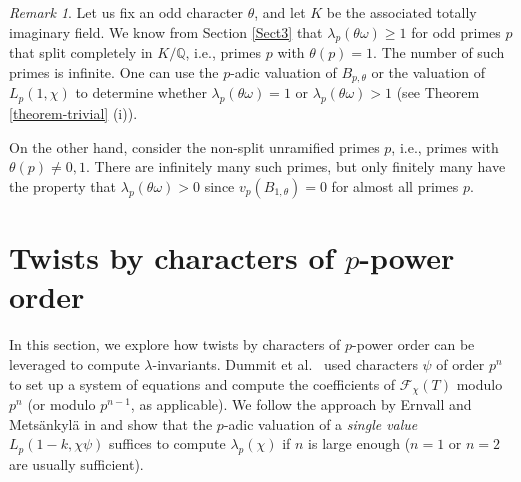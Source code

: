 \documentclass[pdflatex,sn-mathphys-num]{sn-jnl}%
\theoremstyle{plain}
\theoremstyle{definition}
\theoremstyle{remark}
\newtheorem*{rem*}{Remark}
\numberwithin{equation}{section}
\newcommand{\QQ}{\mathbb{Q}}
\begin{document}
\begin{rem*} Let us fix an odd character $\theta$, and let $K$ be the associated totally imaginary field. We know from Section \ref{Sect3} that $\lambda_p(\theta \omega) \geq 1$ for odd primes $p$ that split completely in $K/\QQ$, i.e., primes $p$ with $\theta(p)=1$. The number of such primes is infinite. One can use the $p$-adic valuation of  $B_{p,\theta}$ or the valuation of $L_p(1,\chi)$ to determine whether $\lambda_p(\theta \omega) =1$ or $\lambda_p(\theta \omega) > 1$ (see Theorem \ref{theorem-trivial} (i)).


On the other hand, consider the non-split unramified primes $p$, i.e., primes with $\theta(p) \neq 0, 1$. There are infinitely many such primes, but only finitely many have the property that $\lambda_p(\theta \omega) > 0$  since $v_p(B_{1,\theta})=0$ for almost all primes $p$. 
 


\end{rem*}

\section{Twists by characters of $p$-power order } 
\label{Sect5}  
In this section, we explore how twists by characters of $p$-power order can be leveraged to compute $\lambda$-invariants.
 Dummit et al.\ \cite{Du} used characters $\psi$ of order $p^n$ to set up a system of equations and compute the coefficients of $\mathcal{F}_{\chi}(T)$  modulo $p^n$ (or modulo $p^{n-1}$, as applicable).
 We follow the approach by Ernvall and Metsänkylä  in \cite{ErMe} and show that the $p$-adic valuation of a {\em single value} $L_p(1-k,\chi \psi)$ suffices to compute $\lambda_p(\chi)$ if $n$ is large enough ($n=1$ or $n=2$ are usually sufficient). 
 
\end{document}
